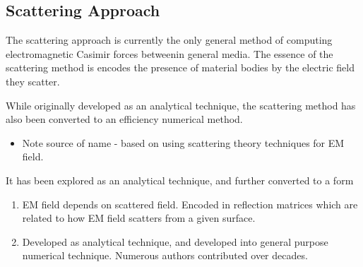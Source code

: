 
\subsection{Scattering Approach}

The scattering approach is currently the only general method of computing 
electromagnetic Casimir forces betweenin general media.  The essence of the scattering method 
is encodes the presence of material bodies by the electric field they scatter.  

While originally developed as an analytical technique, 
the scattering method has also been converted to an efficiency numerical method.  

\begin{itemize}
  \item Note source of name - based on using scattering theory techniques for EM field.
\end{itemize}

It has been explored as an analytical technique,
and further converted to a form 
\begin{enumerate}
\item EM field depends on scattered field.  Encoded in reflection matrices
which are related to how EM field scatters from a given surface.  
\item Developed as analytical technique, and developed into general purpose numerical technique.
Numerous authors contributed over decades.
\end{enumerate}

